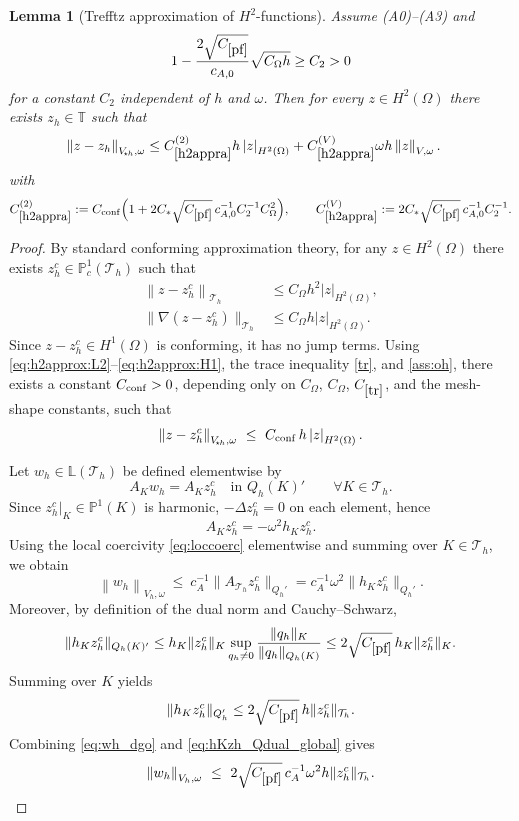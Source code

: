 \documentclass[11pt]{article}
\theoremstyle{definition}
\theoremstyle{plain}
\newtheorem{lemma}[theorem]{Lemma}
\newcommand{\cA}{c_A}
\newcommand{\CD}{C_*}
\newcommand{\const}[1]{C_{\eqref{#1}}}
\newcommand{\Vsh}{V_{\!\star \hspace*{-0.2mm}h}}
\newcommand{\dgonorm}[1]{\norm{#1}_{V_h,\omega}}
\newcommand{\tdgonorm}[1]{{\Vert#1\Vert}_{\Vsh,\omega}}
\newcommand{\dom}{\Omega}
\newcommand{\Th}{{\calT_h}}
\newcommand{\Lh}{\mathbb{L}(\Th)}
\newcommand{\QKh}{Q_h(K)}
\newcommand{\Qh}{Q_h}
\newcommand{\ATh}{A_{\Th}}
\newcommand*{\snorm}[1]{\left|#1\right|}
\newcommand*{\norm}[1]{\left\|#1\right\|}
\newcommand{\IP}{\mathbb{P}}
\newcommand{\ITh}{\mathbb{T}}
\newcommand{\calT}{\mathcal{T}}
\begin{document}
\begin{lemma}[Trefftz approximation of $H^2$-functions]\label{lem:h2approx}
Assume \textup{(A0)}--\textup{(A3)} and
\[
1-\frac{2\sqrt{\const{pf}}}{c_{A,0}}\sqrt{C_\Omega h}\ge C_2>0
\]
for a constant $C_2$ independent of $h$ and $\omega$.
Then for every $z\in H^2(\Omega)$ there exists $z_h\in\ITh$ such that
\begin{align}
\tdgonorm{z-z_h}
&\le \const{h2appra}^{(2)} h \snorm{z}_{H^2(\Omega)}
 + \const{h2appra}^{(V)} \omega h \norm{z}_{V,\omega}.
\label{h2appra}
\end{align}
with
\[
\const{h2appra}^{(2)}
:= C_{\rm conf}\Bigl(1+2\CD \sqrt{\const{pf}}\,c_{A,0}^{-1}C_2^{-1} C_\Omega^2\Bigr),
\qquad
\const{h2appra}^{(V)}
:= 2\CD \sqrt{\const{pf}}\,c_{A,0}^{-1}C_2^{-1}.
\]
\end{lemma}
\begin{proof}
By standard conforming approximation theory, for any $z\in H^2(\Omega)$ there exists
$z_h^{c}\in\IP^1_c(\Th)$ such that
\begin{align}
\norm{z-z_h^{c}}_{\Th} &\le C_\dom h^2 \snorm{z}_{H^2(\Omega)}, \label{eq:h2approx:L2}\\
\|\nabla(z-z_h^{c})\|_{\Th} &\le C_\dom h \snorm{z}_{H^2(\Omega)}. \label{eq:h2approx:H1}
\end{align}
Since $z-z_h^{c}\in H^1(\Omega)$ is conforming, it has no jump terms. Using
\eqref{eq:h2approx:L2}--\eqref{eq:h2approx:H1}, the trace inequality \eqref{tr}, and \eqref{ass:oh},
there exists a constant $C_{\rm conf}>0$, depending only on $C_\dom$, $C_\Omega$,
$\const{tr}$, and the mesh-shape constants, such that
\begin{equation}\label{eq:tdgo_conforming_est}
\tdgonorm{z-z_h^{c}}\ \le\ C_{\rm conf}\, h \snorm{z}_{H^2(\Omega)}.
\end{equation}

Let $w_h\in \Lh$ be defined elementwise by
\[
A_K w_h = A_K z_h^{c} \quad\text{in }\QKh' \qquad \forall K\in\Th.
\]
Since $z_h^{c}|_K\in \IP^1(K)$ is harmonic, $-\Delta z_h^{c}=0$ on each element, hence
\[
A_K z_h^{c} = -\omega^2 h_K z_h^{c}.
\]
Using the local coercivity \eqref{eq:loccoerc} elementwise and summing over $K\in\Th$, we obtain
\begin{equation}\label{eq:wh_dgo}
\dgonorm{w_h}\ \le\ \cA^{-1} \|\ATh z_h^{c}\|_{\Qh'}
= \cA^{-1} \omega^2 \|h_K z_h^{c}\|_{\Qh'}.
\end{equation}
Moreover, by definition of the dual norm and Cauchy--Schwarz,
\[
\|h_K z_h^{c}\|_{\QKh'}
\le h_K\|z_h^{c}\|_{K}\sup_{q_h\neq0}\frac{\|q_h\|_K}{\|q_h\|_{\QKh}}
\le 2\sqrt{\const{pf}}\, h_K\|z_h^{c}\|_{K}.
\]
Summing over $K$ yields
\begin{equation}\label{eq:hKzh_Qdual_global}
\|h_K z_h^{c}\|_{\Qh'} \le 2\sqrt{\const{pf}}\, h \|z_h^{c}\|_{\Th}.
\end{equation}
Combining \eqref{eq:wh_dgo} and \eqref{eq:hKzh_Qdual_global} gives
\begin{equation}\label{eq:whzh}
\dgonorm{w_h}\ \le\ 2\sqrt{\const{pf}}\,\cA^{-1}\omega^2 h \|z_h^{c}\|_{\Th}.
\end{equation}


\end{proof}
\end{document}

